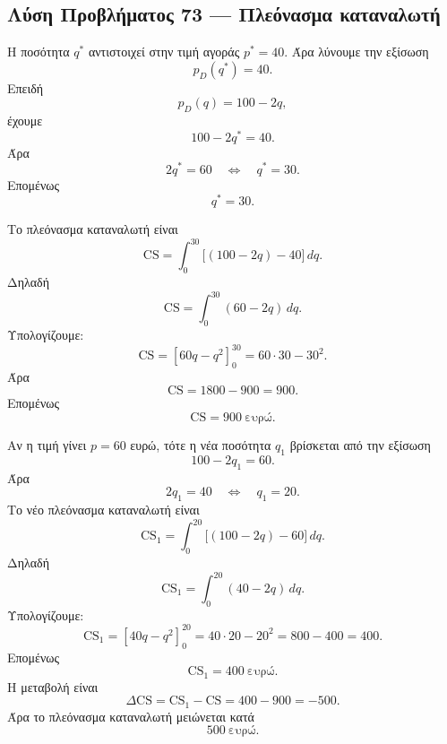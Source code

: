 \subsection*{Λύση Προβλήματος 73 --- Πλεόνασμα καταναλωτή}

\begin{alist}
  \item Η ποσότητα \(q^*\) αντιστοιχεί στην τιμή αγοράς \(p^*=40\).
        Άρα λύνουμε την εξίσωση
        \[
          p_D(q^*)=40.
        \]
        Επειδή
        \[
          p_D(q)=100-2q,
        \]
        έχουμε
        \[
          100-2q^*=40.
        \]
        Άρα
        \[
          2q^*=60
          \quad\Leftrightarrow\quad
          q^*=30.
        \]
        Επομένως
        \[
          {q^*=30}.
        \]

  \item Το πλεόνασμα καταναλωτή είναι
        \[
          \mathrm{CS}
          =
          \int_0^{30}\bigl[(100-2q)-40\bigr]\,dq.
        \]
        Δηλαδή
        \[
          \mathrm{CS}
          =
          \int_0^{30}(60-2q)\,dq.
        \]
        Υπολογίζουμε:
        \[
          \mathrm{CS}
          =
          \left[60q-q^2\right]_0^{30}
          =
          60\cdot30-30^2.
        \]
        Άρα
        \[
          \mathrm{CS}=1800-900=900.
        \]
        Επομένως
        \[
          {\mathrm{CS}=900\ \text{ευρώ}}.
        \]

  \item Αν η τιμή γίνει \(p=60\) ευρώ, τότε η νέα ποσότητα \(q_1\)
        βρίσκεται από την εξίσωση
        \[
          100-2q_1=60.
        \]
        Άρα
        \[
          2q_1=40
          \quad\Leftrightarrow\quad
          q_1=20.
        \]
        Το νέο πλεόνασμα καταναλωτή είναι
        \[
          \mathrm{CS}_1
          =
          \int_0^{20}\bigl[(100-2q)-60\bigr]\,dq.
        \]
        Δηλαδή
        \[
          \mathrm{CS}_1
          =
          \int_0^{20}(40-2q)\,dq.
        \]
        Υπολογίζουμε:
        \[
          \mathrm{CS}_1
          =
          \left[40q-q^2\right]_0^{20}
          =
          40\cdot20-20^2
          =
          800-400
          =
          400.
        \]
        Επομένως
        \[
          {\mathrm{CS}_1=400\ \text{ευρώ}}.
        \]
        Η μεταβολή είναι
        \[
          \Delta\mathrm{CS}
          =
          \mathrm{CS}_1-\mathrm{CS}
          =
          400-900
          =
          -500.
        \]
        Άρα το πλεόνασμα καταναλωτή μειώνεται κατά
        \[
          {500\ \text{ευρώ}}.
        \]
\end{alist}

